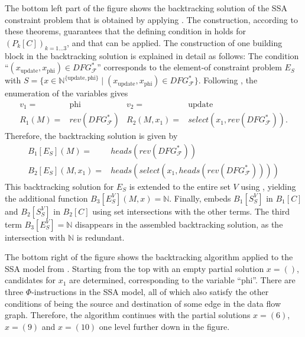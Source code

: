     The bottom left part of the figure shows the backtracking solution
    of the SSA constraint problem that is obtained by applying
    .
    The construction, according to these theorems, guarantees that the defining
    condition in  holds for $(P_k[C])_{k=1\dots3}$, and
    that  can be applied.
    The construction of one building block in the backtracking solution is
    explained in detail as follows:
    The condition ``$(x_\text{update},x_\text{phi})\in DFG_\mathcal F^*$''
    corresponds to the \mbox{element-of} constraint problem $E_S$ with
    $S=\{x\in\mathbb N^{\{\text{update},\text{phi}\}}\mid (x_\text{update},x_\text{phi})\in DFG_\mathcal F^*\}$.
    Following , the enumeration of the variables gives
    \begin{align*}
    v_1={}&\text{phi}&v_2={}&\text{update}\\
    R_1(M)={}&rev(DFG_\mathcal F^*)&
    R_2(M,x_1)={}&select(x_1,rev(DFG_\mathcal F^*)).
    \end{align*}
    Therefore, the backtracking solution is given by
    \begin{align*}
        B_1[E_S](M)={}&heads(rev(DFG_\mathcal F^*))\\
        B_2[E_S](M,x_1)={}&heads(select(x_1,heads(rev(DFG_\mathcal F^*))))
    \end{align*}
    This backtracking solution for $E_S$ is extended to the entire set $V$ using
    , yielding the additional function
    $B_3[E_S^V](M,x)=\mathbb N$.
    Finally,  embeds $B_1[S_S^V]$ in $B_1[C]$ and
    $B_2[S_S^V]$ in $B_2[C]$ using set intersections with the other terms.
    The third term $B_3[E_S^V]=\mathbb N$ disappears in the assembled
    backtracking solution, as the intersection with $\mathbb N$ is redundant.

    The bottom right of the figure shows the backtracking algorithm applied to
    the SSA model from .
    Starting from the top with an empty partial solution $x=()$, candidates for
    $x_1$ are determined, corresponding to the variable ``phi''.
    There are three $\Phi$-instructions in the SSA model, all of which also
    satisfy the other conditions of being the source and destination of some
    edge in the data flow graph.
    Therefore, the algorithm continues with the partial solutions $x=(6)$,
    $x=(9)$ and $x=(10)$ one level further down in the figure.

